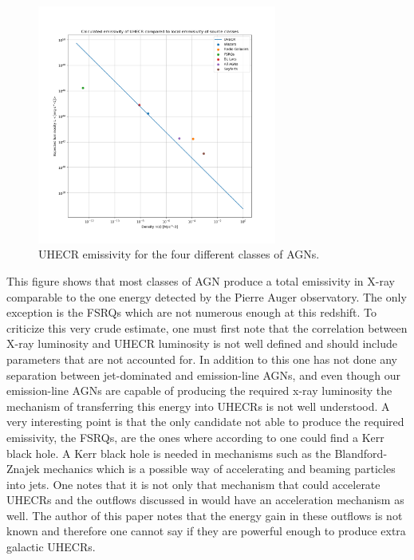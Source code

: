 \documentclass{article}
\begin{document}
\begin{figure}[H]
    \centering
    \includegraphics[width = 0.7\textwidth]{new_plots/L_n_uhecr_calc.png}
    \caption{UHECR emissivity for the four different classes of AGNs.}
    \label{fig:UHECR}
\end{figure}

This figure shows that most classes of AGN produce a total emissivity in X-ray comparable to the one energy detected by the Pierre Auger observatory. The only exception is the FSRQs which are not numerous enough at this redshift. 
To criticize this very crude estimate, one must first note that the correlation between X-ray luminosity and UHECR luminosity is not well defined and should include parameters that are not accounted for.
In addition to this one has not done any separation between jet-dominated and emission-line AGNs, and even though our emission-line AGNs are capable of producing the required x-ray luminosity
the mechanism of transferring this energy into UHECRs is not well understood. A very interesting point is that the only candidate not able to produce the required emissivity, the FSRQs, are the ones where according to \cite{Wei-Hao_2003} one could find a Kerr black hole. 
A Kerr black hole is needed in mechanisms such as the Blandford-Znajek mechanics which is a possible way of accelerating and beaming particles into jets. One notes that it is not only that mechanism that could accelerate UHECRs and 
the outflows discussed in \cite{Laha_2021} would have an acceleration mechanism as well. The author of this paper notes that the energy gain in these outflows is not known and therefore one cannot say if they are powerful enough to produce extra galactic UHECRs. 
\end{document}
